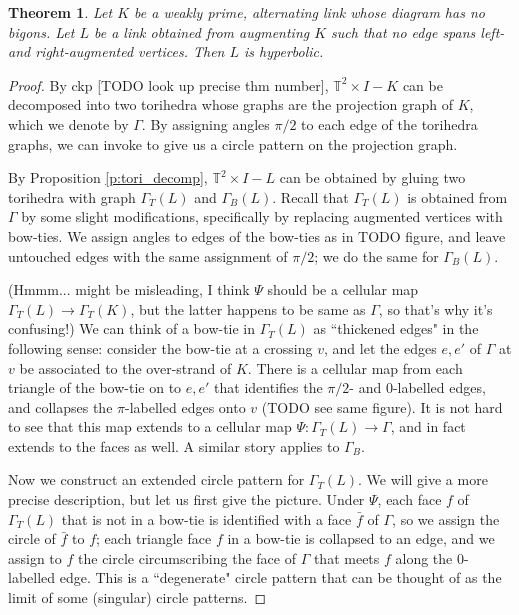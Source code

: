 \documentclass[11pt]{amsart}
\newcommand{\prpref}[1]{Proposition \ref{#1}}
\newcommand{\torus}{{\mathbb{T}^2}}
\newcommand{\toruscomp}[1]{{\torus \times I - #1}}
\theoremstyle{plain}
\newtheorem{theorem}{Theorem}[section]
\theoremstyle{definition}
\begin{document}
\begin{theorem}
Let $K$ be a weakly prime, alternating link whose diagram has no bigons.
Let $L$ be a link obtained from augmenting $K$ such that
no edge spans left- and right-augmented vertices.
Then $L$ is hyperbolic.
\end{theorem}


\begin{proof}
By ckp [TODO look up precise thm number],
$\toruscomp{K}$ can be decomposed
into two torihedra whose graphs are the projection graph of $K$,
which we denote by $\Gamma$.
By assigning angles $\pi/2$ to each edge of the torihedra graphs,
we can invoke \cite[Theorem 3]{BandS} to give us a circle pattern
on the projection graph.

By \prpref{p:tori_decomp}, $\toruscomp{L}$ can be
obtained by gluing two torihedra with graph $\Gamma_T(L)$ and $\Gamma_B(L)$.
Recall that $\Gamma_T(L)$ is obtained from $\Gamma$ by some slight
modifications, specifically by replacing augmented vertices with bow-ties.
We assign angles to edges of the bow-ties as in TODO figure,
and leave untouched edges with the same assignment of $\pi/2$;
we do the same for $\Gamma_B(L)$.


(Hmmm... might be misleading, I think $\Psi$ should be a cellular map
$\Gamma_T(L) \to \Gamma_T(K)$, but the latter happens to be
same as $\Gamma$, so that's why it's confusing!)
We can think of a bow-tie in $\Gamma_T(L)$ as ``thickened edges" in the
following sense: consider the bow-tie at a crossing $v$,
and let the edges $e,e'$ of $\Gamma$ at $v$
be associated to the over-strand of $K$.
There is a cellular map from each triangle of the bow-tie
on to $e, e'$ that identifies the $\pi/2$- and 0-labelled edges,
and collapses the $\pi$-labelled edges onto $v$
(TODO see same figure).
It is not hard to see that this map extends to a cellular map
$\Psi: \Gamma_T(L) \to \Gamma$,
and in fact extends to the faces as well.
A similar story applies to $\Gamma_B$.


Now we construct an extended circle pattern for $\Gamma_T(L)$.
We will give a more precise description,
but let us first give the picture.
Under $\Psi$,
each face $f$ of $\Gamma_T(L)$ that is not in a bow-tie
is identified with a face $\bar{f}$ of $\Gamma$,
so we assign the circle of $\bar{f}$ to $f$;
each triangle face $f$ in a bow-tie is collapsed to an edge,
and we assign to $f$ the circle circumscribing the
face of $\Gamma$ that meets $f$ along the 0-labelled edge.
This is a ``degenerate" circle pattern that can be thought of as
the limit of some (singular) circle patterns.



\end{proof}
\end{document}
